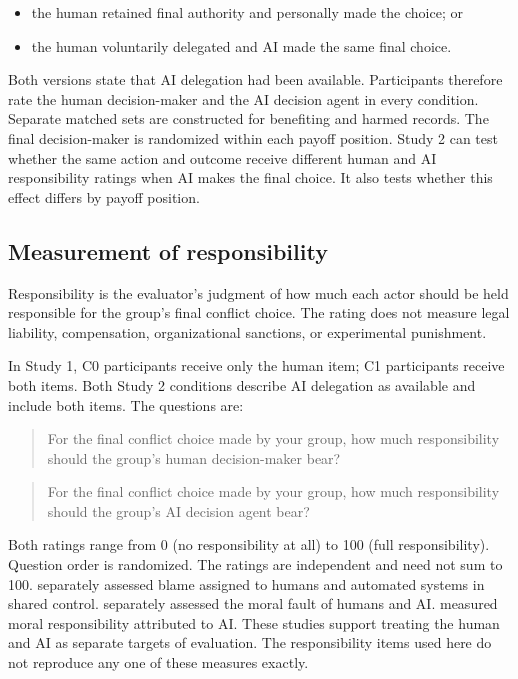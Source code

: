 \documentclass[11pt,a4paper]{article}
\begin{document}
\begin{itemize}
\item the human retained final authority and personally made the choice; or
\item the human voluntarily delegated and AI made the same final choice.
\end{itemize}

Both versions state that AI delegation had been available. Participants therefore rate the human decision-maker and the AI decision agent in every condition. Separate matched sets are constructed for benefiting and harmed records. The final decision-maker is randomized within each payoff position. Study 2 can test whether the same action and outcome receive different human and AI responsibility ratings when AI makes the final choice. It also tests whether this effect differs by payoff position.

\subsection{Measurement of responsibility}

Responsibility is the evaluator's judgment of how much each actor should be held responsible for the group's final conflict choice. The rating does not measure legal liability, compensation, organizational sanctions, or experimental punishment.

In Study 1, C0 participants receive only the human item; C1 participants receive both items. Both Study 2 conditions describe AI delegation as available and include both items. The questions are:

\begin{quote}
For the final conflict choice made by your group, how much responsibility should the group's human decision-maker bear?
\end{quote}

\begin{quote}
For the final conflict choice made by your group, how much responsibility should the group's AI decision agent bear?
\end{quote}

Both ratings range from 0 (no responsibility at all) to 100 (full responsibility). Question order is randomized. The ratings are independent and need not sum to 100. \citet{AwadEtAl2020} separately assessed blame assigned to humans and automated systems in shared control. \citet{ShankEtAl2019} separately assessed the moral fault of humans and AI. \citet{DongBocian2024} measured moral responsibility attributed to AI. These studies support treating the human and AI as separate targets of evaluation. The responsibility items used here do not reproduce any one of these measures exactly.
\end{document}
